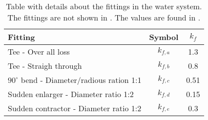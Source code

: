\begin{table}[]
\centering
\begin{tabular}{l|c|c}
Fitting 									  & Symbol 	  & $k_f$   \\ \hline
Tee - Over all loss							  & $k_{f,a}$ & 1.3 	\\
Tee - Straigh through						  & $k_{f,b}$ & 0.8 	\\
$90^\circ$ bend - Diameter/radious ration 1:1 & $k_{f,c}$ & 0.51	\\
Sudden enlarger - Diameter ratio 1:2		  & $k_{f,d}$ & 0.15	\\
Sudden contractor - Diameter ratio 1:2		  & $k_{f,e}$ & 0.3 	
\end{tabular}
\caption{Table with details about the fittings in the water system. The fittings are not shown in . The values are found in \citep{Polypipe,PEPS}.}
\label{tab:pip_detail}
\end{table}

